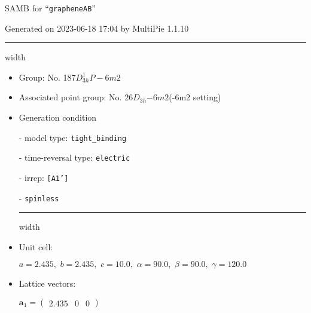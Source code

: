 \documentclass[fleqn,10pt,landscape]{article}
\begin{document}
\setcounter{MaxMatrixCols}{16}

\setlength{\baselineskip}{16pt}
\footnotesize
\begin{center}
\LARGE
SAMB for ``\texttt{grapheneAB}''
\end{center}
\begin{flushright}
Generated on 2023-06-18 17:04 by MultiPie 1.1.10
\end{flushright}
\vspace{1cm}


 \hfil \hrule height 1mm width \textwidth \hfil

\begin{itemize}
\item Group: No. 187\quad$D_{3h}^{1}$\quad$P-6m2$\quad[ hexagonal ]

\item Associated point group: No. 26\quad$D_{3h}$\quad$-6m2$\quad(-6m2 setting)\quad[ hexagonal ]

\vspace{5mm}

\item Generation condition

\quad - model type: \texttt{tight_binding}

\quad - time-reversal type: \texttt{electric}

\quad - irrep: \texttt{[A1']}

\quad - \texttt{spinless}


 \hfil \hrule height 1mm width \textwidth \hfil

\item Unit cell:

\quad $a=2.435,\,\, b=2.435,\,\, c=10.0,\,\, \alpha=90.0,\,\, \beta=90.0,\,\, \gamma=120.0$

\item Lattice vectors:

\quad $\bm{a}_1=\begin{pmatrix} 2.435 & 0 & 0 \end{pmatrix}$


\end{itemize}
\end{document}

